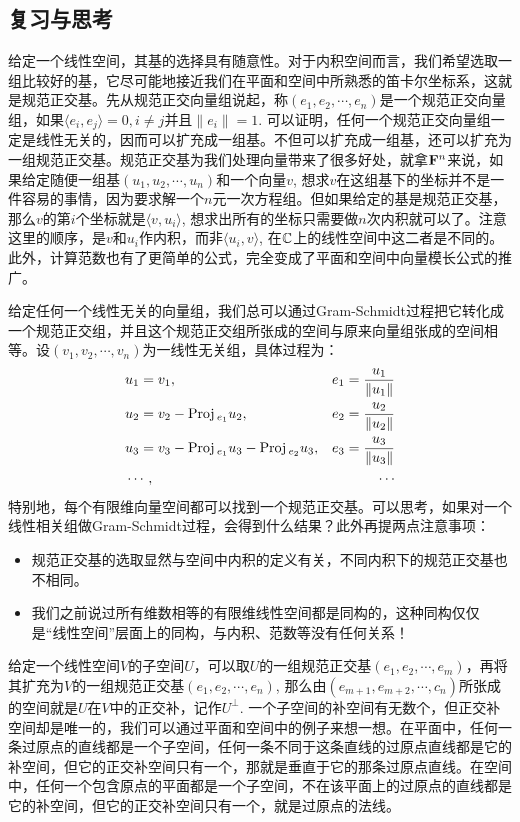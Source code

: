 \documentclass[hyperref,]{ctexart}
\providecommand{\tightlist}{%
  \setlength{\itemsep}{0pt}\setlength{\parskip}{0pt}}
\begin{document}
\subsection{复习与思考}\label{ux590dux4e60ux4e0eux601dux8003-2}

给定一个线性空间，其基的选择具有随意性。对于内积空间而言，我们希望选取一组比较好的基，它尽可能地接近我们在平面和空间中所熟悉的笛卡尔坐标系，这就是规范正交基。先从规范正交向量组说起，称\((e_1,e_2,\cdots,e_n)\)是一个规范正交向量组，如果\(\langle e_i,e_j\rangle=0, i\ne j\)并且\(\|e_i\|=1\).
可以证明，任何一个规范正交向量组一定是线性无关的，因而可以扩充成一组基。不但可以扩充成一组基，还可以扩充为一组规范正交基。规范正交基为我们处理向量带来了很多好处，就拿\(\mathbf{F}^n\)来说，如果给定随便一组基\((u_1,u_2,\cdots,u_n)\)和一个向量\(v\),
想求\(v\)在这组基下的坐标并不是一件容易的事情，因为要求解一个\(n\)元一次方程组。但如果给定的基是规范正交基，那么\(v\)的第\(i\)个坐标就是\(\langle v,u_i\rangle\),
想求出所有的坐标只需要做\(n\)次内积就可以了。注意这里的顺序，是\(v\)和\(u_i\)作内积，而非\(\langle u_i,v\rangle\),
在\(\mathbb{C}\)上的线性空间中这二者是不同的。此外，计算范数也有了更简单的公式，完全变成了平面和空间中向量模长公式的推广。

给定任何一个线性无关的向量组，我们总可以通过Gram-Schmidt过程把它转化成一个规范正交组，并且这个规范正交组所张成的空间与原来向量组张成的空间相等。设\((v_1,v_2,\cdots,v_n)\)为一线性无关组，具体过程为：
\[\begin{aligned}
&u_1 = v_1, &e_1 = \frac{u_1}{\|u_1\|}\\
&u_2 = v_2 - \mathrm{Proj}\,_{e_1} u_2,&e_2=\frac{u_2}{\|u_2\|}\\
&u_3 = v_3 - \mathrm{Proj}\,_{e_1} u_3-\mathrm{Proj}\,_{e_2}u_3,&e_3=\frac{u_3}{\|u_3\|}\\
&\cdots,&\cdots
\end{aligned}\]
特别地，每个有限维向量空间都可以找到一个规范正交基。可以思考，如果对一个线性相关组做Gram-Schmidt过程，会得到什么结果？此外再提两点注意事项：

\begin{itemize}
\tightlist
\item
  规范正交基的选取显然与空间中内积的定义有关，不同内积下的规范正交基也不相同。
\item
  我们之前说过所有维数相等的有限维线性空间都是同构的，这种同构仅仅是``线性空间''层面上的同构，与内积、范数等没有任何关系！
\end{itemize}

给定一个线性空间\(V\)的子空间\(U\)，可以取\(U\)的一组规范正交基\((e_1,e_2,\cdots,e_m)\)，再将其扩充为\(V\)的一组规范正交基\((e_1,e_2,\cdots,e_n)\),
那么由\((e_{m+1},e_{m+2},\cdots,c_{n})\)所张成的空间就是\(U\)在\(V\)中的正交补，记作\(U^{\perp}\).
一个子空间的补空间有无数个，但正交补空间却是唯一的，我们可以通过平面和空间中的例子来想一想。在平面中，任何一条过原点的直线都是一个子空间，任何一条不同于这条直线的过原点直线都是它的补空间，但它的正交补空间只有一个，那就是垂直于它的那条过原点直线。在空间中，任何一个包含原点的平面都是一个子空间，不在该平面上的过原点的直线都是它的补空间，但它的正交补空间只有一个，就是过原点的法线。
\end{document}

